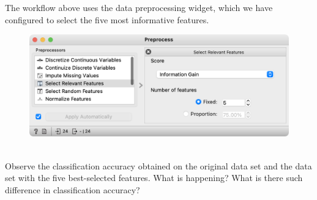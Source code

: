 The workflow above uses the data preprocessing widget, which we have configured to select the five most informative features.

\begin{figure}[h]
    \centering
    \includegraphics[scale=0.4]{preprocess.png}
    \caption{$\;$}
\end{figure}

Observe the classification accuracy obtained on the original data set and the data set with the five best-selected features. What is happening? What is there such difference in classification accuracy?